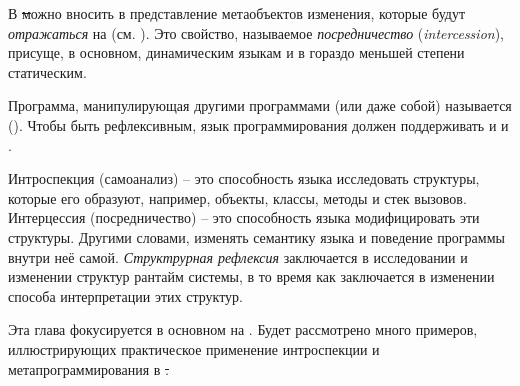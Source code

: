 \documentclass[a4paper,10pt,twoside]{book}
\begin{document}
В \st можно вносить в представление метаобъектов изменения, которые будут \emph{отражаться} на  (см. ). 
Это свойство, называемое \emph{посредничество} (\emph{intercession}), присуще, в основном, динамическим языкам и в гораздо меньшей степени статическим.

Программа, манипулирующая другими программами (или даже собой) называется  ().
Чтобы быть рефлексивным, язык программирования должен поддерживать и  и .

Интроспекция (самоанализ) -- это способность языка исследовать структуры, которые его образуют, например, объекты, классы, методы и стек вызовов.
Интерцессия (посредничество) -- это способность языка модифицировать эти структуры. Другими словами, изменять семантику языка и поведение программы внутри неё самой.
\emph{Структрурная рефлексия} заключается в исследовании и изменении структур рантайм системы, в то время как  заключается в изменении способа интерпретации этих структур.

Эта глава фокусируется в основном на .
Будет рассмотрено много примеров, иллюстрирующих практическое применение интроспекции и метапрограммирования в \st.
\end{document}
